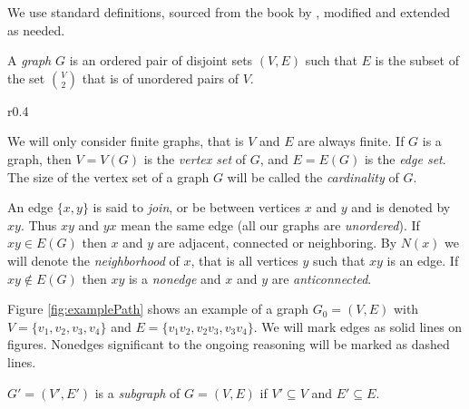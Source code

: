 We use standard definitions, sourced from the book by \citeauthor{BB98} , modified and extended as needed.

\begin{defn}[graph]
  A \emph{graph} $G$ is an ordered pair of disjoint sets $(V, E)$ such that $E$ is the subset of the set $V \choose 2$ that is of unordered pairs of $V$.
\end{defn}

\begin{wrapfigure}{r}{0.4\textwidth}
  \label{fig:examplePath}
  \centering{}
  \caption{An example graph $G_0$}
\end{wrapfigure}

We will only consider finite graphs, that is $V$ and $E$ are always finite. If $G$ is a graph, then $V = V(G)$ is the \emph{vertex set} of $G$, and $E = E(G)$ is the \emph{edge set}. The size of the vertex set of a graph $G$ will be called the \emph{cardinality} of $G$.

An edge $\{x, y\}$ is said to \emph{join}, or be between vertices $x$ and $y$ and is denoted by $xy$. Thus $xy$ and $yx$ mean the same edge (all our graphs are \emph{unordered}). If $xy \in E(G)$ then $x$ and $y$ are adjacent, connected or neighboring. By $N(x)$ we will denote the \emph{neighborhood} of $x$, that is all vertices $y$ such that $xy$ is an edge. If $xy \notin E(G)$ then $xy$ is a \emph{nonedge} and $x$ and $y$ are \emph{anticonnected}.

Figure \ref{fig:examplePath} shows an example of a graph $G_0 = (V, E)$ with $V = \{v_1, v_2, v_3, v_4\}$ and $E = \{v_1v_2, v_2v_3, v_3v_4\}$. We will mark edges as solid lines on figures. Nonedges significant to the ongoing reasoning will be marked as dashed lines.

\begin{defn}[subgraph]
  $G' = (V', E')$ is a \emph{subgraph} of $G = (V, E)$ if $V' \subseteq V$ and $E' \subseteq E$.
\end{defn}

